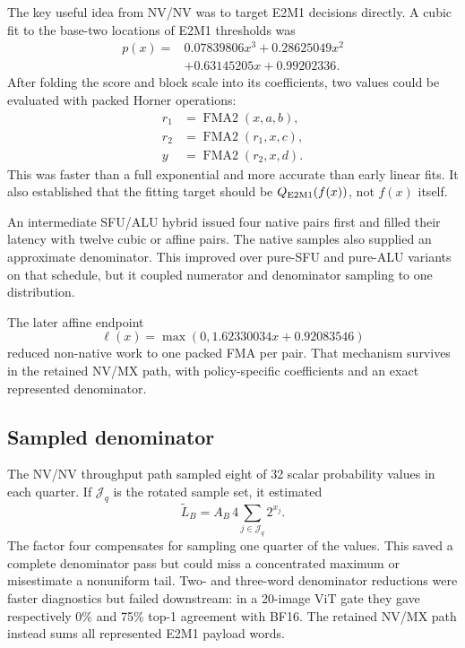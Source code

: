 The key useful idea from NV/NV was to target E2M1 decisions directly. A
cubic fit to the base-two locations of E2M1 thresholds was
\begin{equation}
  \begin{aligned}
    p(x)={}&0.07839806x^3+0.28625049x^2 \\
           &+0.63145205x+0.99202336.
  \end{aligned}
\end{equation}
After folding the score and block scale into its coefficients, two values
could be evaluated with packed Horner operations:
\begin{align}
  r_1 &= \operatorname{FMA2}(x,a,b), \\
  r_2 &= \operatorname{FMA2}(r_1,x,c), \\
  y &= \operatorname{FMA2}(r_2,x,d).
\end{align}
This was faster than a full exponential and more accurate than early linear
fits. It also established that the fitting target should be
$Q_{\mathrm{E2M1}}(f(x))$, not $f(x)$ itself.

An intermediate SFU/ALU hybrid issued four native  pairs first and
filled their latency with twelve cubic or affine pairs. The native samples
also supplied an approximate denominator. This improved over pure-SFU and
pure-ALU variants on that schedule, but it coupled numerator and denominator
sampling to one distribution.

The later affine endpoint
\begin{equation}
  \ell(x)=\max(0,1.62330034x+0.92083546)
\end{equation}
reduced non-native work to one packed FMA per pair. That mechanism survives
in the retained NV/MX path, with policy-specific coefficients and an exact
represented denominator.

\subsection{Sampled denominator}

The NV/NV throughput path sampled eight of 32 scalar probability values in
each quarter. If $\mathcal J_q$ is the rotated sample set, it estimated
\begin{equation}
  \widetilde L_B = A_B\,4
  \sum_{j\in\mathcal J_q}2^{x_j}.
\end{equation}
The factor four compensates for sampling one quarter of the values. This
saved a complete denominator pass but could miss a concentrated maximum or
misestimate a nonuniform tail. Two- and three-word denominator reductions
were faster diagnostics but failed downstream: in a 20-image ViT gate they
gave respectively 0\% and 75\% top-1 agreement with BF16. The retained
NV/MX path instead sums all represented E2M1 payload words.

